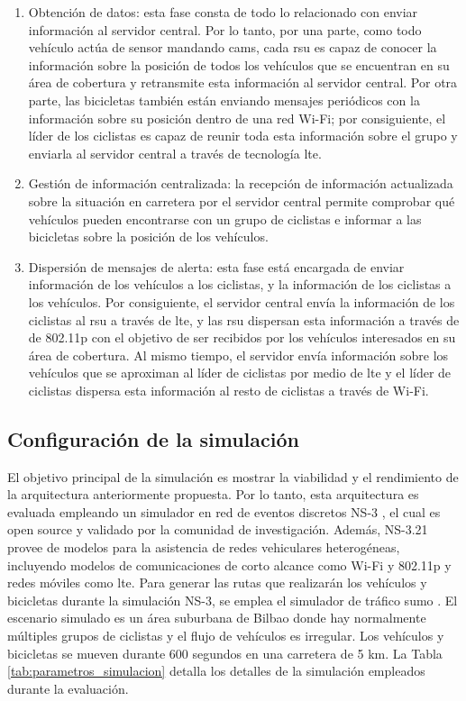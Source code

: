 \begin{enumerate}
	\item Obtención de datos: esta fase consta de todo lo relacionado con enviar
	información al servidor central. Por lo tanto, por una parte, como todo
	vehículo actúa de sensor mandando \gls{cam}s, cada \gls{rsu} es capaz de
	conocer la información sobre la posición de todos los vehículos que se
	encuentran en su área de cobertura y retransmite esta información al
	servidor central. Por otra parte, las bicicletas también están enviando
	mensajes periódicos con la información sobre su posición dentro de una red
	Wi-Fi; por consiguiente, el líder de los ciclistas es capaz de reunir toda
	esta información sobre el grupo y enviarla al servidor central a través de
	tecnología \gls{lte}.

	\item Gestión de información centralizada: la recepción de información
	actualizada sobre la situación en carretera por el servidor central permite
	comprobar qué vehículos pueden encontrarse con un grupo de ciclistas e
	informar a las bicicletas sobre la posición de los vehículos.

	\item Dispersión de mensajes de alerta: esta fase está encargada de enviar
	información de los vehículos a los ciclistas, y la información de los
	ciclistas a los vehículos. Por consiguiente, el servidor central envía la
	información de los ciclistas al \gls{rsu} a través de \gls{lte}, y las
	\gls{rsu} dispersan esta información a través de de \gls{802.11p} con el
	objetivo de ser recibidos por los vehículos interesados en su área de
	cobertura. Al mismo tiempo, el servidor envía información sobre los vehículos
	que se aproximan al líder de ciclistas por medio de \gls{lte} y el líder de
	ciclistas dispersa esta información al resto de ciclistas a través de Wi-Fi.
\end{enumerate}

\subsection{Configuración de la simulación}
El objetivo principal de la simulación es mostrar la viabilidad y el
rendimiento de la arquitectura anteriormente propuesta. Por lo tanto, esta
arquitectura es evaluada empleando un simulador en red de eventos discretos
NS-3 \cite{16}, el cual es open source y validado por la comunidad de
investigación. Además, NS-3.21 provee de modelos para la asistencia de redes
vehiculares heterogéneas, incluyendo modelos de comunicaciones de corto alcance
como Wi-Fi y \gls{802.11p} y redes móviles como \gls{lte}. Para generar las
rutas que realizarán los vehículos y bicicletas durante la simulación NS-3,
se emplea el simulador de tráfico \gls{sumo} \cite{17}. El escenario simulado
es un área suburbana de Bilbao donde hay normalmente múltiples grupos de
ciclistas y el flujo de vehículos es irregular. Los vehículos y bicicletas se
mueven durante 600 segundos en una carretera de 5 km. La Tabla
\ref{tab:parametros_simulacion} detalla los detalles de la simulación empleados
durante la evaluación.

